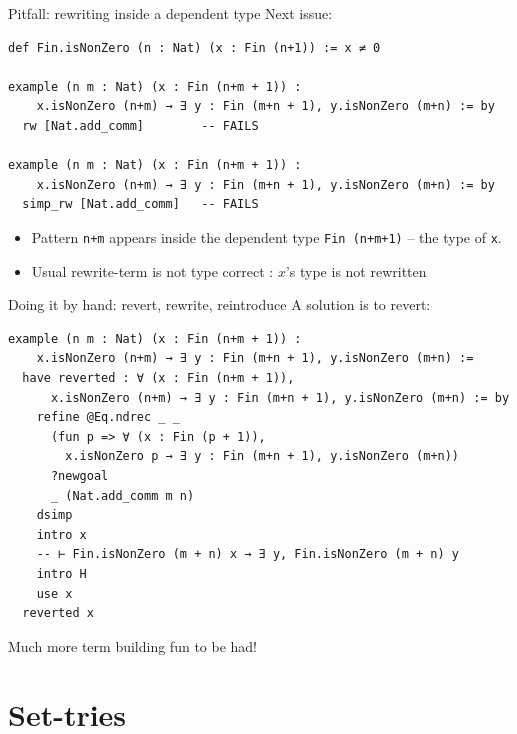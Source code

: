 \documentclass[aspectratio=169]{beamer}
\begin{document}
\begin{frame}[fragile]{Pitfall: rewriting inside a dependent type}
Next issue:
\begin{lstlisting}[basicstyle=\ttfamily\scriptsize]
def Fin.isNonZero (n : Nat) (x : Fin (n+1)) := x ≠ 0

example (n m : Nat) (x : Fin (n+m + 1)) :
    x.isNonZero (n+m) → ∃ y : Fin (m+n + 1), y.isNonZero (m+n) := by
  rw [Nat.add_comm]        -- FAILS

example (n m : Nat) (x : Fin (n+m + 1)) :
    x.isNonZero (n+m) → ∃ y : Fin (m+n + 1), y.isNonZero (m+n) := by
  simp_rw [Nat.add_comm]   -- FAILS
\end{lstlisting}
  \begin{itemize}
    \item Pattern \texttt{n+m} appears inside the \alert{dependent type}
          \texttt{Fin (n+m+1)} -- the type of \texttt{x}.
    \item Usual rewrite-term is \alert{not type correct} : $x$'s type is not rewritten
  \end{itemize}
\end{frame}

\begin{frame}[fragile]{Doing it by hand: revert, rewrite, reintroduce}
A solution is to \alert{revert}:
\begin{lstlisting}[basicstyle=\ttfamily\scriptsize]
example (n m : Nat) (x : Fin (n+m + 1)) :
    x.isNonZero (n+m) → ∃ y : Fin (m+n + 1), y.isNonZero (m+n) :=
  have reverted : ∀ (x : Fin (n+m + 1)),
      x.isNonZero (n+m) → ∃ y : Fin (m+n + 1), y.isNonZero (m+n) := by
    refine @Eq.ndrec _ _
      (fun p => ∀ (x : Fin (p + 1)),
        x.isNonZero p → ∃ y : Fin (m+n + 1), y.isNonZero (m+n))
      ?newgoal
      _ (Nat.add_comm m n)
    dsimp
    intro x
    -- ⊢ Fin.isNonZero (m + n) x → ∃ y, Fin.isNonZero (m + n) y
    intro H
    use x
  reverted x
\end{lstlisting}
Much more term building fun to be had!

\end{frame}

\section{Set-tries}
\end{document}
